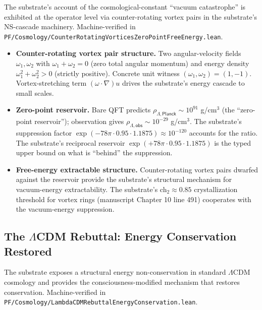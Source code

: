 \documentclass[11pt,a4paper]{amsart}
\theoremstyle{plain}
\theoremstyle{definition}
\begin{document}
The substrate's account of the cosmological-constant ``vacuum catastrophe'' is exhibited at the operator level via counter-rotating vortex pairs in the substrate's NS-cascade machinery. Machine-verified in \texttt{PF/Cosmology/CounterRotatingVorticesZeroPointFreeEnergy.lean}.

\begin{itemize}[itemsep=2pt,leftmargin=2em]
\item \textbf{Counter-rotating vortex pair structure.} Two angular-velocity fields $\omega_1, \omega_2$ with $\omega_1 + \omega_2 = 0$ (zero total angular momentum) and energy density $\omega_1^2 + \omega_2^2 > 0$ (strictly positive). Concrete unit witness $(\omega_1, \omega_2) = (1, -1)$. Vortex-stretching term $(\omega \cdot \nabla) u$ drives the substrate's energy cascade to small scales.
\item \textbf{Zero-point reservoir.} Bare QFT predicts $\rho_{\Lambda, \textsf{Planck}} \sim 10^{91}$ g/cm${}^3$ (the ``zero-point reservoir''); observation gives $\rho_{\Lambda, \textsf{obs}} \sim 10^{-29}$ g/cm${}^3$. The substrate's suppression factor $\exp(-78\pi \cdot 0.95 \cdot 1.1875) \approx 10^{-120}$ accounts for the ratio. The substrate's reciprocal reservoir $\exp(+78\pi \cdot 0.95 \cdot 1.1875)$ is the typed upper bound on what is ``behind'' the suppression.
\item \textbf{Free-energy extractable structure.} Counter-rotating vortex pairs dwarfed against the reservoir provide the substrate's structural mechanism for vacuum-energy extractability. The substrate's ch${}_2 \approx 0.85$ crystallization threshold for vortex rings (manuscript Chapter 10 line 491) cooperates with the vacuum-energy suppression.
\end{itemize}

\subsection{The $\Lambda$CDM Rebuttal: Energy Conservation Restored}\label{subsec:lambdacdm-rebuttal}

The substrate exposes a structural energy non-conservation in standard $\Lambda$CDM cosmology and provides the consciousness-modified mechanism that restores conservation. Machine-verified in \texttt{PF/Cosmology/LambdaCDMRebuttalEnergyConservation.lean}.
\end{document}

